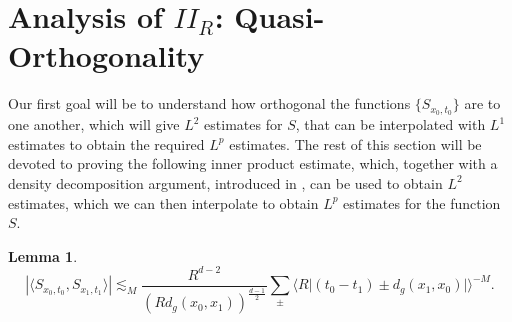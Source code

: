 \documentclass[dvipsnames,letterpaper,12pt]{article}
\newtheorem{lemma}[theorem]{Lemma}
\begin{document}





% 

\section{Analysis of $II_R$: Quasi-Orthogonality}

Our first goal will be to understand how orthogonal the functions $\{ {S\!}_{x_0,t_0} \}$ are to one another, which will give $L^2$ estimates for $S$, that can be interpolated with $L^1$ estimates to obtain the required $L^p$ estimates. The rest of this section will be devoted to proving the following inner product estimate, which, together with a density decomposition argument, introduced in \cite{HeoandNazarovandSeeger}, can be used to obtain $L^2$ estimates, which we can then interpolate to obtain $L^p$ estimates for the function $S$.

\begin{lemma} \label{mainOrthogonalityLemma}
    \[ \left| \langle {S\!}_{x_0,t_0}, {S\!}_{x_1,t_1} \rangle \right| \lesssim_M \frac{R^{d-2}}{( R d_g(x_0,x_1) )^{\frac{d-1}{2}}} \sum_{\pm} \Big\langle R \big| (t_0 - t_1) \pm d_g(x_1,x_0) \big| \Big\rangle^{-M}. \]
\end{lemma}
\end{document}
